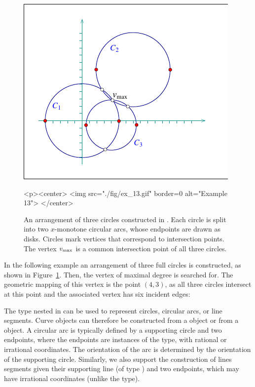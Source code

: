 \begin{figure}[t]
\begin{ccTexOnly}
  \begin{center}
  \includegraphics{Arrangement_2/fig/ex_13}
  \end{center}
\end{ccTexOnly}
\begin{ccHtmlOnly}
  <p><center>
  <img src="./fig/ex_13.gif" border=0 alt="Example 13">
  </center>
\end{ccHtmlOnly}
\caption{An arrangement of three circles constructed in
. Each circle is split into two $x$-monotone
circular arcs, whose endpoints are drawn as disks. Circles
mark vertices that correspond to intersection points. The vertex
$v_{\rm max}$ is a common intersection point of all three
circles.}
\label{arr_fig:ex_13}
\end{figure}

In the following example an arrangement of three full circles is
constructed, as shown in Figure~\ref{arr_fig:ex_13}. Then, the vertex
of maximal degree is searched for. The geometric mapping of this
vertex is the point $(4,3)$, as all three circles intersect at this point
and the associated vertex has six incident edges:


The  type nested in  can be
used to represent circles, circular arcs, or line segments. Curve objects
can therefore be constructed from a  object or from
a  object. A circular arc is typically defined by
a supporting circle and two endpoints, where the endpoints are instances
of the  type, with rational or irrational coordinates. The
orientation of the arc is determined by the orientation of the supporting
circle. Similarly, we also support the construction of lines segments given
their supporting line (of type ) and two endpoints, which
may have irrational coordinates (unlike the  type).

